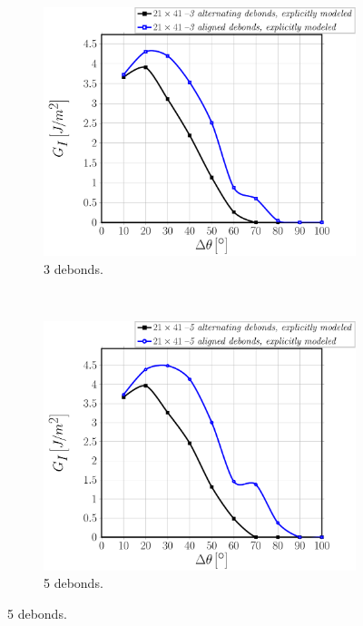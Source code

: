 \documentclass[smallextended]{svjour3}       %
\begin{document}
\begin{figure}[!h]
\centering
    \begin{subfigure}[b]{0.475\textwidth}
        \includegraphics[width=\textwidth]{comparison-explicitmodel-3debs-vf60-GI.pdf}
        \caption{3 debonds.}\label{subfig:finitedebscomparisonModeI3debs}
    \end{subfigure} ~
    \begin{subfigure}[b]{0.475\textwidth}
        \includegraphics[width=\textwidth]{comparison-explicitmodel-5debs-vf60-GI.pdf}
        \caption{5 debonds.}\label{subfig:finitedebscomparisonModeI5debs}
    \end{subfigure}
    

\end{figure}
\end{document}
